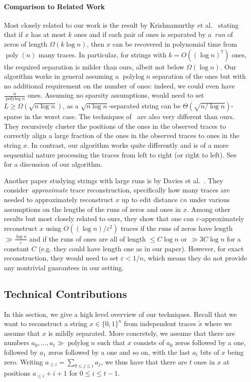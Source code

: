 \documentclass[12pt]{article}
\theoremstyle{definition}
\theoremstyle{remark}
\newcommand{\eps}{\varepsilon}
\DeclareMathOperator*{\polylog}{polylog}
\DeclareMathOperator*{\poly}{poly}
\begin{document}
\paragraph{Comparison to Related Work}
Most closely related to our work is the result by Krishnamurthy et al.~\cite{KrishnamurthyMMP21} stating that if $x$ has at most $k$ ones and if each pair of ones is separated by a~\emph{run} of zeros of length $\Omega(k\log n)$, then $x$ can be recovered in polynomial time from $\poly(n)$ many traces. In particular, for strings with $k=O((\log n)^7)$ ones, the required separation is milder than ours, albeit not below $\Omega(\log n)$. Our algorithm works in general assuming a $\polylog n$ separation of the ones but with no additional requirement on the number of ones: indeed, we could even have $\frac{n}{\polylog n}$ ones. Assuming no sparsity assumptions, \cite{KrishnamurthyMMP21} would need to set $L \ge \Omega(\sqrt{n \log n})$, as a $\sqrt{n \log n}$-separated string can be $\Theta(\sqrt{n/\log n})$-sparse in the worst case. The techniques of~\cite{KrishnamurthyMMP21} are also very different than ours. They recursively cluster the positions of the ones in the observed traces to correctly align a large fraction of the ones in the observed traces to ones in the string $x$. In contrast, our algorithm works quite differently and is of a more sequential nature processing the traces from left to right (or right to left). See~ for a discussion of our algorithm.

Another paper studying strings with large runs is by Davies et al.~\cite{DaviesRSR21}. They consider~\emph{approximate} trace reconstruction, specifically how many traces are needed to approximately reconstruct $x$ up to edit distance $\eps n$ under various assumptions on the lengths of the runs of zeros and ones in $x$. Among other results but most closely related to ours, they show that one can $\eps$-approximately reconstruct $x$ using $O((\log n)/\eps^2)$ traces if the runs of zeros have length $\gg \frac{\log n}{\eps}$ and if the runs of ones are all of length $\leq C \log n$  or $\gg 3C\log n$ for a constant $C$ (e.g. they could have length one as in our paper). However, for exact reconstruction, they would need to set $\eps < 1/n$, which means they do not provide any nontrivial guarantees in our setting.






\subsection{Technical Contributions}\label{sec:technical_contributions}
In this section, we give a high level overview of our techniques. Recall that we want to reconstruct a string $x\in \{0,1\}^n$ from independent traces $\tilde x$ where we assume that $x$ is mildly separated. More concretely, we assume that there are numbers $a_0,\dots,a_t \gg \polylog n$ such that $x$ consists of $a_0$ zeros followed by a one, followed by $a_1$ zeros followed by a one and so on, with the last $a_t$ bits of $x$ being zero. Writing $a_{\leq i}=\sum_{0\leq j\leq i} a_j$, we thus have that there are $t$ ones in $x$ at positions $a_{\leq i}+i+1$ for $0\leq i\leq t-1$. 
\end{document}
